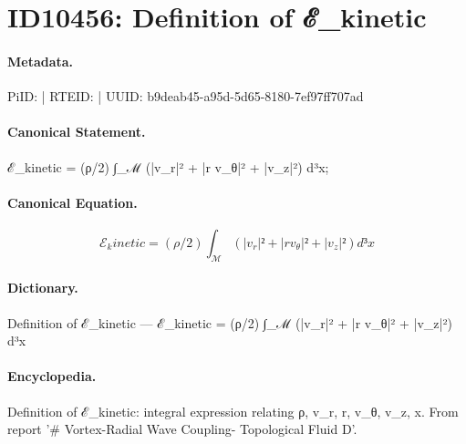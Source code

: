 \section*{ID10456: Definition of ℰ\_kinetic}
\paragraph{Metadata.}
PiID:  | RTEID:  | UUID: b9deab45-a95d-5d65-8180-7ef97ff707ad

\paragraph{Canonical Statement.}
ℰ\_kinetic = (ρ/2) ∫\_ℳ (|v\_r|² + |r v\_θ|² + |v\_z|²) d³x;

\paragraph{Canonical Equation.}
\[
ℰ_kinetic = (ρ/2) ∫_ℳ (|v_r|² + |r v_θ|² + |v_z|²) d³x
\]

\paragraph{Dictionary.}
Definition of ℰ\_kinetic — ℰ\_kinetic = (ρ/2) ∫\_ℳ (|v\_r|² + |r v\_θ|² + |v\_z|²) d³x

\paragraph{Encyclopedia.}
Definition of ℰ\_kinetic: integral expression relating ρ, v\_r, r, v\_θ, v\_z, x. From report '\# Vortex-Radial Wave Coupling- Topological Fluid D'.
